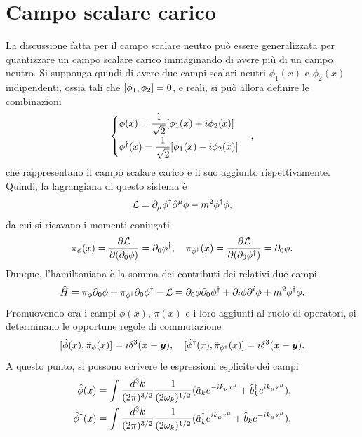 \section{Campo scalare carico}
La discussione fatta per il campo scalare neutro può essere generalizzata per quantizzare un campo scalare carico immaginando di avere più di un campo neutro. Si supponga quindi di avere due campi scalari neutri $\phi_1(x)$ e $\phi_2(x)$  indipendenti, ossia tali che $[\phi_1,\phi_2] = 0$, e reali, si può allora definire le combinazioni 
\begin{equation}
    \begin{cases}
        \phi(x) = \dfrac{1}{\sqrt{2}}[\phi_1(x) + i\phi_2(x)] \\[1.5ex]
        \phi^\dagger(x)= \dfrac{1}{\sqrt{2}}[\phi_1(x) - i\phi_2(x)]
    \end{cases},
\end{equation}
che rappresentano il campo scalare carico e il suo aggiunto rispettivamente. Quindi, la lagrangiana di questo sistema è
\begin{equation}
\label{eq: lagrangiana campo scalare carico}
    \mathcal{L} = \partial_\mu\phi^\dagger\partial^\mu\phi - m^2\phi^\dagger\phi,
\end{equation}
da cui si ricavano i momenti coniugati
\begin{equation}
    \pi_\phi(x) = \frac{\partial\mathcal{L}}{\partial(\partial_0\phi)} = \partial_0\phi^\dagger,\quad \pi_{\phi^\dagger}(x) = \frac{\partial\mathcal{L}}{\partial(\partial_0\phi^\dagger)} = \partial_0\phi.
\end{equation}
Dunque, l'hamiltoniana è la somma dei contributi dei relativi due campi 
\begin{equation}
\label{eq: hamiltoniana campo scalare carico pre-sostituzione campi}
    \hat{H} = \pi_\phi\partial_0\phi + \pi_{\phi^\dagger}\partial_0\phi^\dagger - \mathcal{L} = \partial_0\phi\partial_0\phi^\dagger + \partial_i\phi\partial^i\phi + m^2\phi^\dagger\phi.
\end{equation}
Promuovendo ora i campi $\phi(x)$, $\pi(x)$ e i loro aggiunti al ruolo di operatori, si determinano le opportune regole di commutazione 
\begin{equation}
    [\hat{\phi}(x),\hat{\pi}_\phi(x)] = i\delta^3(\bm{x} - \bm{y}),\quad[\hat{\phi}^\dagger(x),\hat{\pi}_{\phi^\dagger}(x)] = i\delta^3(\bm{x} - \bm{y}).
\end{equation}
A questo punto, si possono scrivere le espressioni esplicite dei campi
\begin{align}
\label{eq: campo scalare carico quantizzato}
    \hat{\phi}(x) &= \int\frac{d^3k}{(2\pi)^{3/2}}\frac{1}{(2\omega_k)^{1/2}}(\hat{a}_k e^{-ik_\mu x^\mu} + \hat{b}^\dagger_k e^{ik_\mu x^\mu}), \\
    \hat{\phi}^\dagger(x) &= \int\frac{d^3k}{(2\pi)^{3/2}}\frac{1}{(2\omega_k)^{1/2}}(\hat{a}^\dagger_k e^{ik_\mu x^\mu} + \hat{b}_k e^{-ik_\mu x^\mu}),
\end{align}
